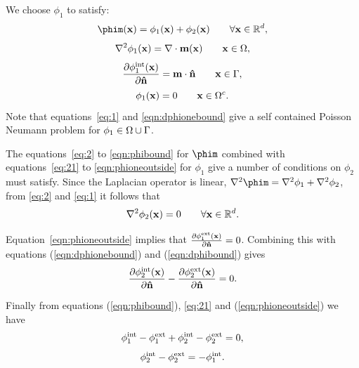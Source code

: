 We choose $\phi_1$ to satisfy:
\begin{equation}
  \phim(\xv) = \phi_1(\xv) + \phi_2(\xv) \qquad \forall \xv \in \fulld,
  \label{eq:21}
\end{equation}
\begin{equation}
  \nabla^2 \phi_1(\mathbf{x}) = \nabla \cdot \mathbf{m}(\mathbf{x}) \qquad \mathbf{x} \in \Omega,
  \label{eq:1}
\end{equation}
\begin{equation}
  \frac{\partial \phi^{\text{int}}_1(\mathbf{x})}{\partial \mathbf{\hat{n}}} = \mathbf{m} \cdot \mathbf{\hat{n}} \qquad \mathbf{x} \in {\Gamma},
  \label{eqn:dphionebound}
\end{equation}
\begin{equation}
  \phi_1(\mathbf{x}) = 0 \qquad \mathbf{x} \in {\Omega^c}.
  \label{eqn:phioneoutside}
\end{equation}
Note that equations~\eqref{eq:1} and \eqref{eqn:dphionebound} give a self contained Poisson Neumann problem for $\phi_1 \in \Omega \cup {\Gamma}$.

The equations~\eqref{eq:2} to \eqref{eqn:phibound} for $\phim$ combined with equations~\eqref{eq:21} to \eqref{eqn:phioneoutside} for $\phi_1$ give a number of conditions on $\phi_2$ must satisfy. Since the Laplacian operator is linear, \ie $\nabla^2 \phim = \nabla^2 \phi_1 + \nabla^2 \phi_2$, from \eqref{eq:2} and \eqref{eq:1} it follows that
\begin{equation}
  \label{eq:8}
  \nabla^2 \phi_2(\mathbf{x}) = 0 \qquad \forall \mathbf{x} \in {\mathbb{R}^d}.
\end{equation}

Equation~\eqref{eqn:phioneoutside} implies that $\frac{\partial \phi^{\text{ext}}_1(\mathbf{x})}{\partial \mathbf{\hat{n}}} = 0$. Combining this with equations (\ref{eqn:dphionebound}) and (\ref{eqn:dphibound}) gives
\begin{equation}
  \label{eq:5}
  \frac{\partial \phi^{\text{int}}_2(\mathbf{x})}{\partial \mathbf{\hat{n}}} - \frac{\partial \phi^{\text{ext}}_2(\mathbf{x})}{\partial \mathbf{\hat{n}}} = 0.
\end{equation}

Finally from equations (\ref{eqn:phibound}), \eqref{eq:21} and (\ref{eqn:phioneoutside}) we have
\begin{equation*}
  \phi^{\text{int}}_1 - \phi^{\text{ext}}_1 + \phi^{\text{int}}_2 - \phi^{\text{ext}}_2 = 0,
\end{equation*}
\begin{equation}
  \phi^{\text{int}}_2 - \phi^{\text{ext}}_2 = - \phi^{\text{int}}_1.
\label{eq:4}
\end{equation}

